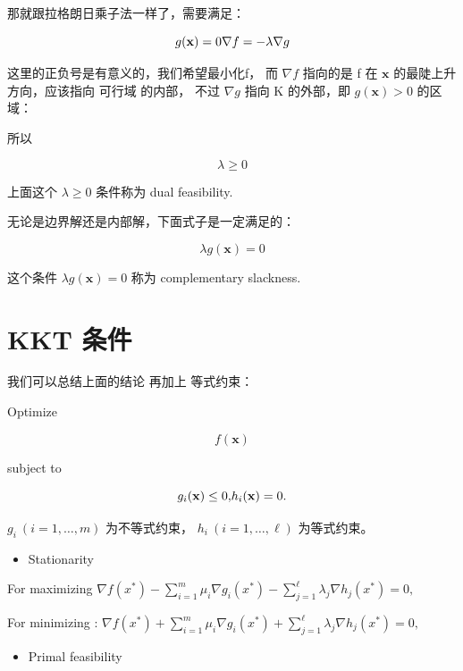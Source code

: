 \documentclass[
]{book}
\providecommand{\tightlist}{%
  \setlength{\itemsep}{0pt}\setlength{\parskip}{0pt}}
\begin{document}
那就跟拉格朗日乘子法一样了，需要满足：

\[
g(\mathbf{x}) = 0 \\
\nabla f = -\lambda \nabla g
\]

这里的正负号是有意义的，我们希望最小化f， 而 \(\nabla f\) 指向的是 f 在 \(\mathbf{x}\) 的最陡上升方向，应该指向 可行域 的内部， 不过 \(\nabla g\) 指向 K 的外部，即 \(g(\mathbf{x}) > 0\) 的区域：

所以

\[
\lambda \ge 0 
\]

上面这个 \(\lambda \ge 0\) 条件称为 dual feasibility.

无论是边界解还是内部解，下面式子是一定满足的：

\[
\lambda g(\mathbf{x}) = 0
\]

这个条件 \(\lambda g(\mathbf{x}) = 0\) 称为 complementary slackness.

\hypertarget{kkt-ux6761ux4ef6-1}{%
\section{KKT 条件}\label{kkt-ux6761ux4ef6-1}}

我们可以总结上面的结论 再加上 等式约束：

Optimize

\[
f(\mathbf {x} )
\]

subject to

\[
{\displaystyle g_{i}(\mathbf {x} )\leq 0,}\\
{\displaystyle h_{i}(\mathbf {x} )=0.}
\]

\({\displaystyle g_{i}\ (i=1,\ldots ,m)}\) 为不等式约束， \({\displaystyle h_{i}\ (i=1,\ldots ,\ell )}\) 为等式约束。

\begin{itemize}
\tightlist
\item
  Stationarity
\end{itemize}

For maximizing \({\displaystyle \nabla f(x^{*})-\sum _{i=1}^{m}\mu _{i}\nabla g_{i}(x^{*})-\sum _{j=1}^{\ell }\lambda _{j}\nabla h_{j}(x^{*})=0,}\)

For minimizing : \({\displaystyle \nabla f(x^{*})+\sum _{i=1}^{m}\mu _{i}\nabla g_{i}(x^{*})+\sum _{j=1}^{\ell }\lambda _{j}\nabla h_{j}(x^{*})=0,}\)

\begin{itemize}
\tightlist
\item
  Primal feasibility
\end{itemize}
\end{document}
